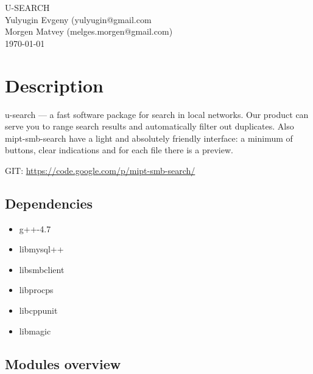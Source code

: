 \documentclass[11pt, oneside, a4paper]{book}
\begin{document}
\hypersetup{pageanchor=false,citecolor=blue,colorlinks=true, linkcolor=black, filecolor=black, citecolor=black, urlcolor=blue, pdfauthor = Evgeny Yulyugin, pdftitle=mipt-smb-search guide}

\begin{titlepage}
\vspace*{7cm}
\begin{center}
{\Large U-\/\-S\-E\-A\-R\-C\-H }\\
\vspace*{1cm}
{\large Yulyugin Evgeny (yulyugin@gmail.com}\\
{\large Morgen Matvey (melges.morgen@gmail.com)}\\
\vspace*{0.5cm}
{\small \today}\\
\end{center}
\end{titlepage}
\clearemptydoublepage
{}
\tableofcontents
\clearemptydoublepage
{}
\hypersetup{pageanchor=true,citecolor=blue}

\chapter{Description}

u-search --- a fast software package for search in local networks. Our product can serve you to range search results and automatically filter out duplicates. Also mipt-smb-search have a light and absolutely friendly interface: a minimum of buttons, clear indications and for each file there is a preview.

GIT: \url{https://code.google.com/p/mipt-smb-search/}

\section{Dependencies}

\begin{itemize}
  \item g++-4.7
  \item libmysql++
  \item libsmbclient
  \item libprocps
  \item libcppunit
  \item libmagic
\end{itemize}

\section{Modules overview}
\end{document}
